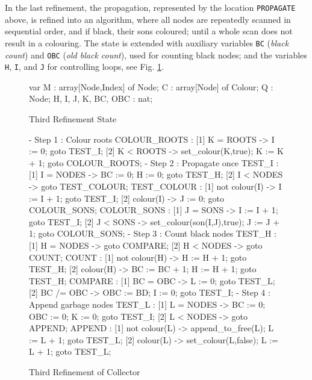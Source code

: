 In the last refinement,  the propagation, represented by  the location
{\tt PROPAGATE}  above, is refined into an  algorithm, where all nodes
are repeatedly  scanned in sequential  order, and if black, their sons
coloured;  until a  whole scan  does not  result in  a colouring.  The
state   is  extended with auxiliary  variables   {\tt  BC} ({\em black
  count}) and {\tt OBC}   ({\em old black  count}), used  for counting
black  nodes; and the  variables {\tt  H}, {\tt I},   and {\tt J}  for
controlling loops, see Fig. \ref{refinement3-state}.

\begin{figure}[htb]
\begin{smallsession}
  var
    M   : array[Node,Index] of Node;
    C   : array[Node] of Colour;
    Q   : Node;
    H, I, J, K, BC, OBC : nat;
\end{smallsession}
\caption{Third Refinement State}
\label{refinement3-state}
\end{figure}

\begin{figure}[htb]
\begin{smallsession}
- Step 1 : Colour roots
  COLOUR_ROOTS : 
    [1] K = ROOTS -> I := 0; goto TEST_I;
    [2] K < ROOTS -> set_colour(K,true); K := K + 1; goto COLOUR_ROOTS;
- Step 2 : Propagate once
  TEST_I :
    [1] I = NODES -> BC := 0; H := 0; goto TEST_H;
    [2] I < NODES -> goto TEST_COLOUR;
  TEST_COLOUR :
    [1] not colour(I) -> I := I + 1; goto TEST_I;
    [2] colour(I)  -> J := 0; goto COLOUR_SONS;
  COLOUR_SONS :
    [1] J = SONS -> I := I + 1; goto TEST_I;
    [2] J < SONS -> set_colour(son(I,J),true); J := J + 1; 
        goto COLOUR_SONS;
- Step 3 : Count black nodes
  TEST_H :
    [1] H = NODES -> goto COMPARE;
    [2] H < NODES -> goto COUNT;
  COUNT :
    [1] not colour(H) -> H := H + 1; goto TEST_H;
    [2] colour(H) -> BC := BC + 1; H := H + 1; goto TEST_H;
  COMPARE :
    [1] BC = OBC -> L := 0; goto TEST_L;
    [2] BC /= OBC -> OBC := BD; I := 0; goto TEST_I;
- Step 4 : Append garbage nodes
  TEST_L :
    [1] L = NODES -> BC := 0; OBC := 0; K := 0; goto TEST_I;
    [2] L < NODES -> goto APPEND;
  APPEND :
    [1] not colour(L) -> append_to_free(L); L := L + 1; goto TEST_L;
    [2] colour(L) -> set_colour(L,false); L := L + 1; goto TEST_L; 
\end{smallsession}
\caption{Third Refinement of Collector}
\label{refinement3-collector}
\end{figure}

